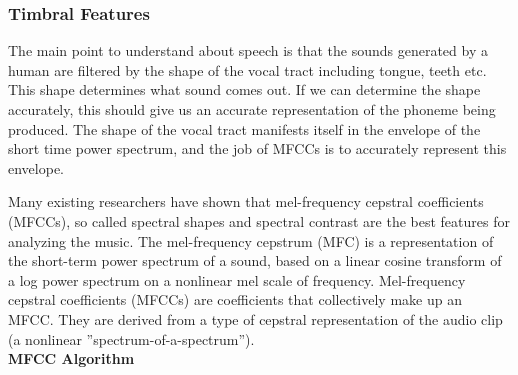 \subsubsection{Timbral Features}
The main point to understand about speech is that the sounds generated by a human are filtered by the shape of the vocal tract including tongue, teeth etc. This shape
determines what sound comes out. If we can determine the shape accurately, this should give us an accurate representation of the phoneme being produced. The shape of
the vocal tract manifests itself in the envelope of the short time power spectrum, and the job of MFCCs is to accurately represent this envelope.
\par Many existing researchers have shown that mel-frequency cepstral coefficients (MFCCs), so called spectral shapes and spectral contrast are
the best features for analyzing the music. The mel-frequency cepstrum (MFC) is a representation of the short-term power spectrum of a sound, based
on a linear cosine transform of a log power spectrum on a nonlinear mel scale of frequency. Mel-frequency cepstral coefficients (MFCCs) are coefficients
that collectively make up an MFCC. They are derived from a type of cepstral representation of the audio clip (a nonlinear ”spectrum-of-a-spectrum”).\\
\textbf{MFCC Algorithm}

